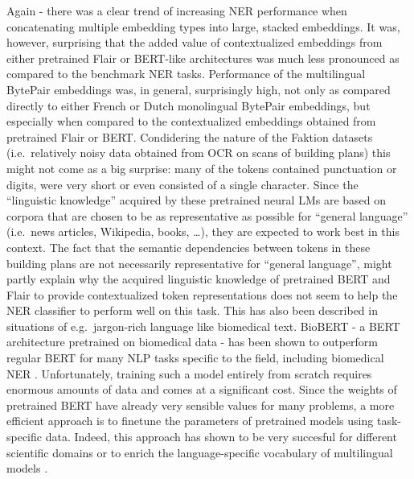 \documentclass[12pt,a4paper,]{book}
\begin{document}
Again - there was a clear trend of increasing NER performance when concatenating multiple embedding types into large, stacked embeddings. It was, however, surprising that the added value of contextualized embeddings from either pretrained Flair or BERT-like architectures was much less pronounced as compared to the benchmark NER tasks. Performance of the multilingual BytePair embeddings was, in general, surprisingly high, not only as compared directly to either French or Dutch monolingual BytePair embeddings, but especially when compared to the contextualized embeddings obtained from pretrained Flair or BERT. Condidering the nature of the Faktion datasets (i.e.~relatively noisy data obtained from OCR on scans of building plans) this might not come as a big surprise: many of the tokens contained punctuation or digits, were very short or even consisted of a single character. Since the ``linguistic knowledge'' acquired by these pretrained neural LMs are based on corpora that are chosen to be as representative as possible for ``general language'' (i.e.~news articles, Wikipedia, books, \ldots{}), they are expected to work best in this context. The fact that the semantic dependencies between tokens in these building plans are not necessarily representative for ``general language'', might partly explain why the acquired linguistic knowledge of pretrained BERT and Flair to provide contextualized token representations does not seem to help the NER classifier to perform well on this task. This has also been described in situations of e.g.~jargon-rich language like biomedical text. BioBERT - a BERT architecture pretrained on biomedical data - has been shown to outperform regular BERT for many NLP tasks specific to the field, including biomedical NER \citep{lee2020}. Unfortunately, training such a model entirely from scratch requires enormous amounts of data and comes at a significant cost. Since the weights of pretrained BERT have already very sensible values for many problems, a more efficient approach is to finetune the parameters of pretrained models using task-specific data. Indeed, this approach has shown to be very succesful for different scientific domains \citep{beltagy2019} or to enrich the language-specific vocabulary of multilingual models \citep{wang2019}.
\end{document}
